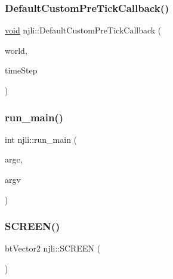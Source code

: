 \mbox{\label{namespacenjli_a198074fecee1ecd3469a9eb42d3b1672}} 
\subsubsection{\texorpdfstring{Default\+Custom\+Pre\+Tick\+Callback()}{DefaultCustomPreTickCallback()}}
{\footnotesize\ttfamily \mbox{\hyperlink{_thread_8h_af1e856da2e658414cb2456cb6f7ebc66}{void}} njli\+::\+Default\+Custom\+Pre\+Tick\+Callback (\begin{DoxyParamCaption}\item[{bt\+Dynamics\+World $\ast$}]{world,  }\item[{bt\+Scalar}]{time\+Step }\end{DoxyParamCaption})}

\mbox{\label{namespacenjli_a763b51626ae6d3f240198aa15876fbf1}} 
\subsubsection{\texorpdfstring{run\+\_\+main()}{run\_main()}}
{\footnotesize\ttfamily int njli\+::run\+\_\+main (\begin{DoxyParamCaption}\item[{int}]{argc,  }\item[{char $\ast$$\ast$}]{argv }\end{DoxyParamCaption})}

\mbox{\label{namespacenjli_a7cd195555cbed7b1657e1d48aa0070f5}} 
\subsubsection{\texorpdfstring{S\+C\+R\+E\+E\+N()}{SCREEN()}}
{\footnotesize\ttfamily bt\+Vector2 njli\+::\+S\+C\+R\+E\+EN (\begin{DoxyParamCaption}{ }\end{DoxyParamCaption})\hspace{0.3cm}{\ttfamily [inline]}}



